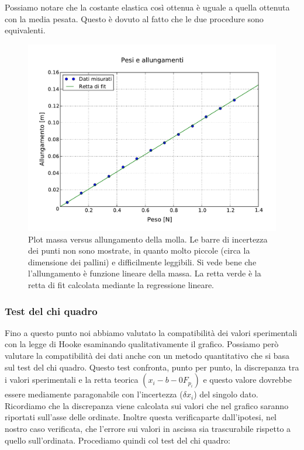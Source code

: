 Possiamo notare che la costante elastica così ottenua è uguale a quella ottenuta con la media pesata. Questo è dovuto al fatto che le due procedure sono equivalenti.

\begin{figure}
    \centering
    \includegraphics[width=120mm]{immagini/pesi_allungamenti.pdf}
    \caption{Plot massa versus allungamento della molla. Le barre di incertezza dei punti non sono mostrate,
        in quanto molto piccole (circa la dimensione dei pallini) e difficilmente leggibili. Si vede bene
        che l'allungamento è funzione lineare della massa. La retta verde è la retta di fit calcolata mediante la regressione lineare.}
    \label{fig:regressione}
\end{figure}

\subsubsection{Test del chi quadro}

Fino a questo punto noi abbiamo valutato la compatibilità dei valori sperimentali con la legge di Hooke esaminando qualitativamente il grafico. Possiamo però valutare la compatibilità dei dati anche con un metodo quantitativo che si basa sul test del chi quadro. Questo test confronta, punto per punto, la discrepanza tra i valori sperimentali e la retta teorica
$(x_i - b-0 F_{p_i})$ e questo valore dovrebbe essere mediamente paragonabile con l'incertezza ($\delta x_i$) del singolo dato. Ricordiamo che la discrepanza viene calcolata sui valori che nel grafico saranno riportati sull'asse delle ordinate. Inoltre questa verificaparte dall'ipotesi, nel nostro caso verificata, che l'errore sui valori in ascissa sia trascurabile rispetto a quello sull'ordinata.
Procediamo quindi col test del chi quadro:

